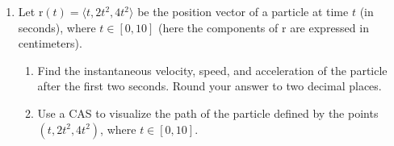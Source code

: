 \documentclass{exercises}
\begin{document}
\begin{enumerate}[resume]
\begin{enumerate}[label=(\alph*)]
  \item Use a CAS to visualize the path of the particle---that is, the set of all points of coordinates $(\cos t,\sin t,2t)$, where $t\in[0,30]$.
\end{enumerate}
\item \techrequired Let $\text{r}(t)=\langle t,2t^{2},4t^{2}\rangle$ be the position vector of a particle at time $t$ (in seconds), where $t\in[0,10]$ (here the components of $\text{r}$ are expressed in centimeters).
\begin{enumerate}[label=(\alph*)]
  \item Find the instantaneous velocity, speed, and acceleration of the particle after the first two seconds. Round your answer to two decimal places.
  \item Use a CAS to visualize the path of the particle defined by the points $(t,2t^{2},4t^{2})$, where $t\in[0,10]$.
\end{enumerate}
\end{enumerate}
\end{document}
